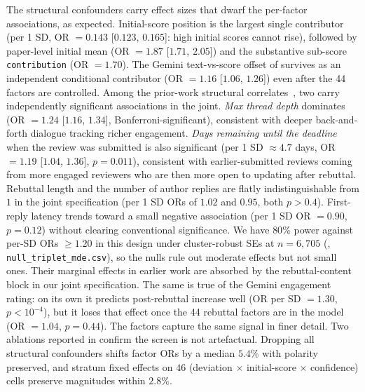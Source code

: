 \documentclass{article}
\newcommand{\code}[1]{\texttt{#1}}
\begin{document}
The structural confounders carry effect sizes that dwarf the per-factor associations, as expected. Initial-score position is the largest single contributor (per 1 SD, OR $= 0.143$ [$0.123$, $0.165$]: high initial scores cannot rise), followed by paper-level initial mean (OR $= 1.87$ [$1.71$, $2.05$]) and the substantive sub-score \code{contribution} (OR $= 1.70$). The Gemini text-vs-score offset of  survives as an independent conditional contributor (OR $= 1.16$ [$1.06$, $1.26$]) even after the 44 factors are controlled. Among the prior-work structural correlates~\cite{huang,jung,kargaran}, two carry independently significant associations in the joint. \emph{Max thread depth} dominates (OR $= 1.24$ [$1.16$, $1.34$], Bonferroni-significant), consistent with deeper back-and-forth dialogue tracking richer engagement. \emph{Days remaining until the deadline} when the review was submitted is also significant (per 1 SD $\approx 4.7$ days, OR $= 1.19$ [$1.04$, $1.36$], $p = 0.011$), consistent with earlier-submitted reviews coming from more engaged reviewers who are then more open to updating after rebuttal. Rebuttal length and the number of author replies are flatly indistinguishable from $1$ in the joint specification (per 1 SD ORs of $1.02$ and $0.95$, both $p > 0.4$). First-reply latency trends toward a small negative association (per 1 SD OR $= 0.90$, $p = 0.12$) without clearing conventional significance. We have $80\%$ power against per-SD ORs $\geq 1.20$ in this design under cluster-robust SEs at $n = 6{,}705$ (, \code{null\_triplet\_mde.csv}), so the nulls rule out moderate effects but not small ones. Their marginal effects in earlier work are absorbed by the rebuttal-content block in our joint specification. The same is true of the Gemini engagement rating: on its own it predicts post-rebuttal increase well (OR per SD $= 1.30$, $p < 10^{-4}$), but it loses that effect once the 44 rebuttal factors are in the model (OR $= 1.04$, $p = 0.44$). The factors capture the same signal in finer detail. Two ablations reported in  confirm the screen is not artefactual. Dropping all structural confounders shifts factor ORs by a median $5.4\%$ with polarity preserved, and stratum fixed effects on $46$ (deviation $\times$ initial-score $\times$ confidence) cells preserve magnitudes within $2.8\%$.
\end{document}
